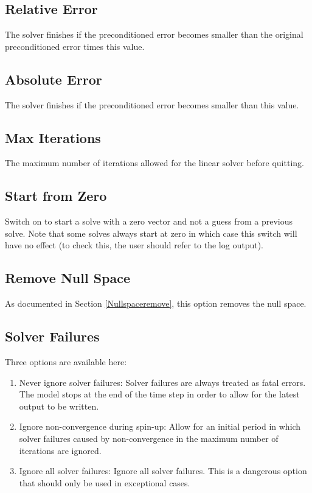\subsection{Relative Error}

The solver finishes if the preconditioned error becomes smaller than the original preconditioned error times this value. 

\subsection{Absolute Error}

The solver finishes if the preconditioned error becomes smaller than this value.

\subsection{Max Iterations}

The maximum number of iterations allowed for the linear solver before quitting.

\subsection{Start from Zero}

Switch on to start a solve with a zero vector and not a guess from a previous solve. Note that some solves always start at zero in which case this switch will have no effect (to check this, the user should refer to the log output). 

\subsection{Remove Null Space}

As documented in Section \ref{Nullspaceremove}, this option removes the null space.

\subsection{Solver Failures}

Three options are available here:

\begin{enumerate}
\item Never ignore solver failures: Solver failures are always treated as fatal errors. The model stops at the end of the time step in order to allow for the latest output to be written. 
\item Ignore non-convergence during spin-up: Allow for an initial period in which solver failures caused by non-convergence in the maximum number of iterations are ignored. 
\item Ignore all solver failures: Ignore all solver failures. This is a dangerous option that should only be used in exceptional cases. 
\end{enumerate}

